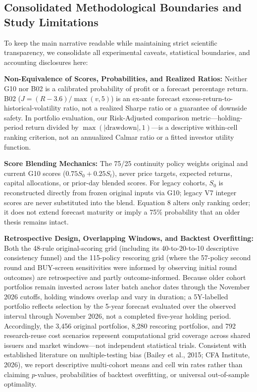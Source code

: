 \documentclass[11pt,a4paper]{article}
\numberwithin{table}{section}
\begin{document}
\subsection{Consolidated Methodological Boundaries and Study Limitations}

To keep the main narrative readable while maintaining strict scientific transparency, we consolidate all experimental caveats, statistical boundaries, and accounting disclosures here:

\textbf{Non-Equivalence of Scores, Probabilities, and Realized Ratios:}  Neither G10 nor B02 is a calibrated probability of profit or a forecast percentage return. B02 ($J = (R - 3.6)/\max(v, 5)$) is an ex-ante forecast excess-return-to-historical-volatility ratio, not a realized Sharpe ratio or a guarantee of downside safety. In portfolio evaluation, our Risk-Adjusted comparison metric---holding-period return divided by $\max(\vert{}\text{drawdown}\vert{}, 1)$---is a descriptive within-cell ranking criterion, not an annualized Calmar ratio or a fitted investor utility function.

\textbf{Score Blending Mechanics:}  The 75/25 continuity policy weights original and current G10 scores ($0.75S_0 + 0.25S_t$), never price targets, expected returns, capital allocations, or prior-day blended scores. For legacy cohorts, $S_0$ is reconstructed directly from frozen original inputs via G10; legacy V7 integer scores are never substituted into the blend. Equation 8 alters only ranking order; it does not extend forecast maturity or imply a 75\% probability that an older thesis remains intact.

\textbf{Retrospective Design, Overlapping Windows, and Backtest Overfitting:}  Both the 48-rule original-scoring grid (including its 40-to-20-to-10 descriptive consistency funnel) and the 115-policy rescoring grid (where the 57-policy second round and BUY-screen sensitivities were informed by observing initial round outcomes) are retrospective and partly outcome-informed. Because older cohort portfolios remain invested across later batch anchor dates through the November 2026 cutoffs, holding windows overlap and vary in duration; a 5Y-labelled portfolio reflects selection by the 5-year forecast evaluated over the observed interval through November 2026, not a completed five-year holding period. Accordingly, the 3,456 original portfolios, 8,280 rescoring portfolios, and 792 research-reuse cost scenarios represent computational grid coverage across shared issuers and market windows---not independent statistical trials. Consistent with established literature on multiple-testing bias (Bailey et al., 2015; CFA Institute, 2026), we report descriptive multi-cohort means and cell win rates rather than claiming $p$-values, probabilities of backtest overfitting, or universal out-of-sample optimality.
\end{document}
